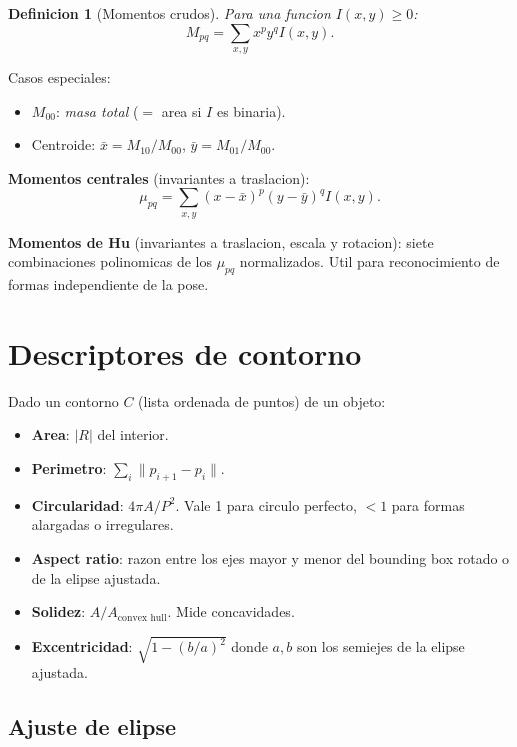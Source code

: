 \documentclass[11pt,a4paper,twoside,openright]{book}
\newtheorem{definicion}{Definicion}[chapter]
\begin{document}
\begin{definicion}[Momentos crudos]
Para una funcion $I(x,y) \geq 0$:
\begin{equation}
M_{pq} = \sum_{x,y} x^p y^q I(x,y).
\end{equation}
\end{definicion}

Casos especiales:
\begin{itemize}[leftmargin=2em]
  \item $M_{00}$: \emph{masa total} ($=$ area si $I$ es binaria).
  \item Centroide: $\bar{x} = M_{10}/M_{00}$, $\bar{y} = M_{01}/M_{00}$.
\end{itemize}

\textbf{Momentos centrales} (invariantes a traslacion):
\begin{equation}
\mu_{pq} = \sum_{x,y} (x-\bar{x})^p (y-\bar{y})^q I(x,y).
\end{equation}

\textbf{Momentos de Hu} (invariantes a traslacion, escala y rotacion): siete combinaciones polinomicas de los $\mu_{pq}$ normalizados. Util para reconocimiento de formas independiente de la pose.

\section{Descriptores de contorno}

Dado un contorno $C$ (lista ordenada de puntos) de un objeto:

\begin{itemize}[leftmargin=2em]
  \item \textbf{Area}: $|R|$ del interior.
  \item \textbf{Perimetro}: $\sum_i \|p_{i+1} - p_i\|$.
  \item \textbf{Circularidad}: $4\pi A / P^2$. Vale 1 para circulo perfecto, $< 1$ para formas alargadas o irregulares.
  \item \textbf{Aspect ratio}: razon entre los ejes mayor y menor del bounding box rotado o de la elipse ajustada.
  \item \textbf{Solidez}: $A / A_{\text{convex hull}}$. Mide concavidades.
  \item \textbf{Excentricidad}: $\sqrt{1 - (b/a)^2}$ donde $a, b$ son los semiejes de la elipse ajustada.
\end{itemize}

\subsection{Ajuste de elipse}
\end{document}
